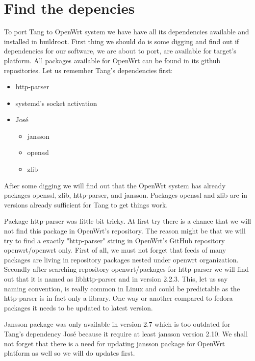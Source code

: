 \section{Find the depencies}

To port Tang to OpenWrt system we have have all its dependencies available and installed in buildroot.
First thing we should do is some digging and find out if dependencies for our software, we are about to port, are available for target's platform.
All packages available for OpenWrt can be found in its github repositories.
Let us remember Tang's dependencies first:

\begin{itemize}
\item http-parser
\item systemd's socket activation
\item José
    \begin{itemize}
    \item jansson
    \item openssl
    \item zlib
    \end{itemize}
\end{itemize}

After some digging we will find out that the OpenWrt system has already packages openssl, zlib, http-parser, and jansson.
Packages openssl and zlib are in versions already sufficient for Tang to get things work.

Package http-parser was little bit tricky.
At first try there is a chance that we will not find this package in OpenWrt's repository.
The reason might be that we will try to find a exactly "http-parser" string in OpenWrt's GitHub repository openwrt/openwrt only.
First of all, we must not forget that feeds of many packages are living in repository packages nested under openwrt organization.
Secondly after searching repository openwrt/packages for http-parser we will find out that it is named as libhttp-parser and in version 2.2.3.
This, let us say naming convention, is really common in Linux and could be predictable as the http-parser is in fact only a library.
One way or another compared to fedora packages it needs to be updated to latest version.

Jansson package was only available in version 2.7 which is too outdated for Tang's dependency José because it require at least jansson version 2.10.
We shall not forget that there is a need for updating jansson package for OpenWrt platform as well so we will do updates first.

